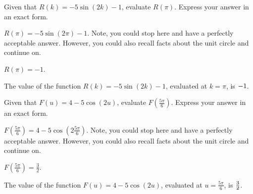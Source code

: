\begin{shuffle}
\begin{exercise}
Given that $R(k)=-5 \sin (2 k)-1$, evaluate $R\left(\pi\right)$. Express your answer in an exact form.
\begin{solution}
\begin{hint}
$R\left(\pi\right)=-5 \sin \left(2 \pi\right)-1$. Note, you could stop here and have a perfectly acceptable answer. However, you could also recall facts about the unit circle and continue on. 
\end{hint}
\begin{hint}
$R\left(\pi\right)=-1$.
\end{hint}
The value of the function $R(k)=-5 \sin (2 k)-1$, evaluated at $k=\pi$, is ${-1}$.
\end{solution}
\end{exercise}

\begin{exercise}
Given that $F(u)=4-5 \cos (2 u)$, evaluate $F\left(\frac{5 \pi }{6}\right)$. Express your answer in an exact form.
\begin{solution}
\begin{hint}
$F\left(\frac{5 \pi }{6}\right)=4-5 \cos \left(2 \frac{5 \pi }{6}\right)$. Note, you could stop here and have a perfectly acceptable answer. However, you could also recall facts about the unit circle and continue on. 
\end{hint}
\begin{hint}
$F\left(\frac{5 \pi }{6}\right)=\frac{3}{2}$.
\end{hint}
The value of the function $F(u)=4-5 \cos (2 u)$, evaluated at $u=\frac{5 \pi }{6}$, is ${\frac{3}{2}}$.
\end{solution}
\end{exercise}


\end{shuffle}


